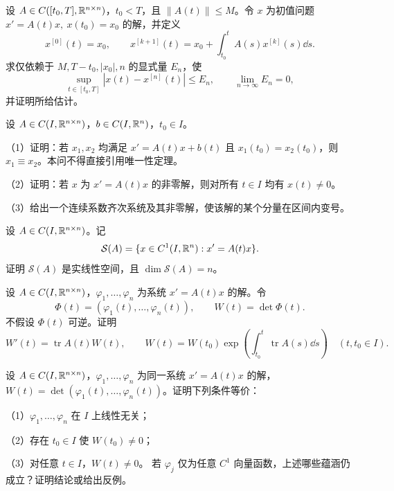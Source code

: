 \noindent\begin{minipage}{\linewidth}
设 $A\in C([t_0,T],\mathbb R^{n\times n})$，$t_0<T$，且 $\|A(t)\|\le M$。令 $x$ 为初值问题 $x'=A(t)x,\ x(t_0)=x_0$ 的解，并定义
\[x^{[0]}(t)=x_0,\qquad x^{[k+1]}(t)=x_0+\int_{t_0}^t A(s)x^{[k]}(s)\dd s.\]
求仅依赖于 $M,T-t_0,|x_0|,n$ 的显式量 $E_n$，使
\[\sup_{t\in[t_0,T]}|x(t)-x^{[n]}(t)|\le E_n,\qquad\lim_{n\to\infty}E_n=0,\]
并证明所给估计。
\end{minipage}\par\vspace{5pt}
\noindent\begin{minipage}{\linewidth}
设 $A\in C(I,\mathbb R^{n\times n})$，$b\in C(I,\mathbb R^n)$，$t_0\in I$。
\par（1）证明：若 $x_1,x_2$ 均满足 $x'=A(t)x+b(t)$ 且 $x_1(t_0)=x_2(t_0)$，则 $x_1\equiv x_2$。本问不得直接引用唯一性定理。
\par（2）证明：若 $x$ 为 $x'=A(t)x$ 的非零解，则对所有 $t\in I$ 均有 $x(t)\ne0$。
\par（3）给出一个连续系数齐次系统及其非零解，使该解的某个分量在区间内变号。
\end{minipage}\par\vspace{5pt}
\noindent\begin{minipage}{\linewidth}
设 $A\in C(I,\mathbb R^{n\times n})$。记
\[\mathcal S(A)=\{x\in C^1(I,\mathbb R^n):x'=A(t)x\}.\]
证明 $\mathcal S(A)$ 是实线性空间，且 $\dim\mathcal S(A)=n$。
\end{minipage}\par\vspace{5pt}
\noindent\begin{minipage}{\linewidth}
设 $A\in C(I,\mathbb R^{n\times n})$，$\varphi_1,\ldots,\varphi_n$ 为系统 $x'=A(t)x$ 的解。令
\[\Phi(t)=(\varphi_1(t),\ldots,\varphi_n(t)),\qquad W(t)=\det\Phi(t).\]
不假设 $\Phi(t)$ 可逆。证明
\[W'(t)=\operatorname{tr}A(t)W(t),\qquad W(t)=W(t_0)\exp\!\left(\int_{t_0}^t\operatorname{tr}A(s)\dd s\right)\quad(t,t_0\in I).\]
\end{minipage}\par\vspace{5pt}
\noindent\begin{minipage}{\linewidth}
设 $A\in C(I,\mathbb R^{n\times n})$，$\varphi_1,\ldots,\varphi_n$ 为同一系统 $x'=A(t)x$ 的解，$W(t)=\det(\varphi_1(t),\ldots,\varphi_n(t))$。证明下列条件等价：
\par（1）$\varphi_1,\ldots,\varphi_n$ 在 $I$ 上线性无关；
\par（2）存在 $t_0\in I$ 使 $W(t_0)\ne0$；
\par（3）对任意 $t\in I$，$W(t)\ne0$。
若 $\varphi_j$ 仅为任意 $C^1$ 向量函数，上述哪些蕴涵仍成立？证明结论或给出反例。
\end{minipage}\par\vspace{5pt}
